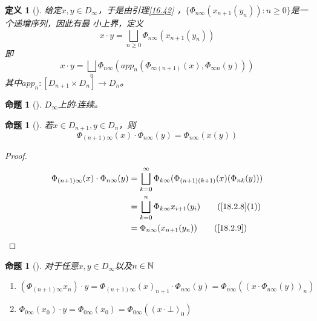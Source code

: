 \documentclass[11pt]{article}
\newtheorem{proposition}[theorem]{命题}
\newtheorem{definition}[theorem]{定义}
\begin{document}
\begin{definition}[]
给定\(x,y\in D_\infty\)，于是由引理\ref{16.42} ，\(\{\Phi_{n\infty}(x_{n+1}(y_n)):n\ge 0\}\)是一个递增序列，因此有最
小上界，定义
\begin{equation*}
x\cdot y=\bigsqcup_{n\ge 0}\Phi_{n\infty}(x_{n+1}(y_n))
\end{equation*}
即
\begin{equation*}
x\cdot y=\bigsqcup_n\Phi_{n\infty}(app_n(\Phi_{\infty(n+1)}(x),\Phi_{\infty n}(y)))
\end{equation*}
其中\(app_n:[D_{n+1}\times D_n]\to D_n\)。
\end{definition}


\begin{proposition}[]
\label{18.2.11}
\(D_\infty\)上的\(\cdot\)连续。
\end{proposition}

\begin{proposition}[]
\label{18.2.12}
若\(x\in D_{n+1},y\in D_n\)，则
\begin{equation*}
\Phi_{(n+1)\infty}(x)\cdot\Phi_{n\infty}(y)=\Phi_{n\infty}(x(y))
\end{equation*}
\end{proposition}

\begin{proof}
\begin{align*}
\Phi_{(n+1)\infty}(x)\cdot\Phi_{n\infty}(y)&=
\bigsqcup_{k=0}^\infty\Phi_{k\infty}(\Phi_{(n+1)(k+1)}(x)(\Phi_{nk}(y)))\\
&=\bigsqcup_{k=0}^n\Phi_{k\infty}x_{i+1}(y_i)\tag{\ref{18.2.8}(1)}\\
&=\Phi_{n\infty}(x_{n+1}(y_n))\tag{\ref{18.2.9}}
\end{align*}
\end{proof}

\begin{proposition}[]
\label{18.2.13}
对于任意\(x,y\in D_\infty\)以及\(n\in\mathbb{N}\)
\begin{enumerate}
\item \((\Phi_{(n+1)\infty}x_n)\cdot y=\Phi_{(n+1)\infty}(x)_{n+1}\cdot\Phi_{n\infty}(y)=\Phi_{n\infty}((x\cdot\Phi_{n\infty}(y))_n)\)
\item \(\Phi_{0\infty}(x_0)\cdot y=\Phi_{0\infty}(x_0)=\Phi_{0\infty}((x\cdot\bot)_0)\)
\end{enumerate}
\end{proposition}
\end{document}
